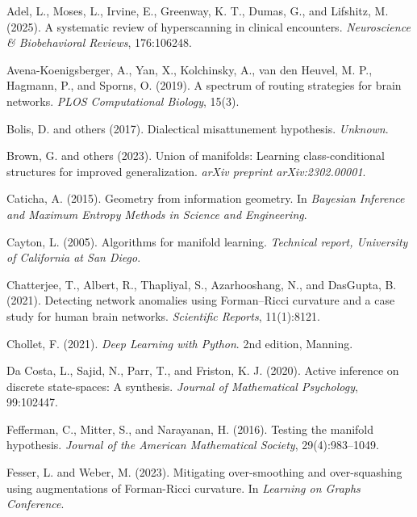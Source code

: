 \documentclass{article}
\theoremstyle{definition}
\begin{document}
\begin{thebibliography}{99}

Adel, L., Moses, L., Irvine, E., Greenway, K. T., Dumas, G., and Lifshitz, M. (2025).
A systematic review of hyperscanning in clinical encounters.
\textit{Neuroscience \& Biobehavioral Reviews}, 176:106248.

Avena-Koenigsberger, A., Yan, X., Kolchinsky, A., van den Heuvel, M. P., Hagmann, P., and Sporns, O. (2019).
A spectrum of routing strategies for brain networks.
\textit{PLOS Computational Biology}, 15(3).

Bolis, D. and others (2017).
Dialectical misattunement hypothesis.
\textit{Unknown}.

Brown, G. and others (2023).
Union of manifolds: Learning class-conditional structures for improved generalization.
\textit{arXiv preprint arXiv:2302.00001}.

Caticha, A. (2015).
Geometry from information geometry.
In \textit{Bayesian Inference and Maximum Entropy Methods in Science and Engineering}.

Cayton, L. (2005).
Algorithms for manifold learning.
\textit{Technical report, University of California at San Diego}.

Chatterjee, T., Albert, R., Thapliyal, S., Azarhooshang, N., and DasGupta, B. (2021).
Detecting network anomalies using Forman–Ricci curvature and a case study for human brain networks.
\textit{Scientific Reports}, 11(1):8121.

Chollet, F. (2021).
\textit{Deep Learning with Python}.
2nd edition, Manning.

Da Costa, L., Sajid, N., Parr, T., and Friston, K. J. (2020).
Active inference on discrete state-spaces: A synthesis.
\textit{Journal of Mathematical Psychology}, 99:102447.

Fefferman, C., Mitter, S., and Narayanan, H. (2016).
Testing the manifold hypothesis.
\textit{Journal of the American Mathematical Society}, 29(4):983–1049.

Fesser, L. and Weber, M. (2023).
Mitigating over-smoothing and over-squashing using augmentations of Forman-Ricci curvature.
In \textit{Learning on Graphs Conference}.


\end{thebibliography}
\end{document}
